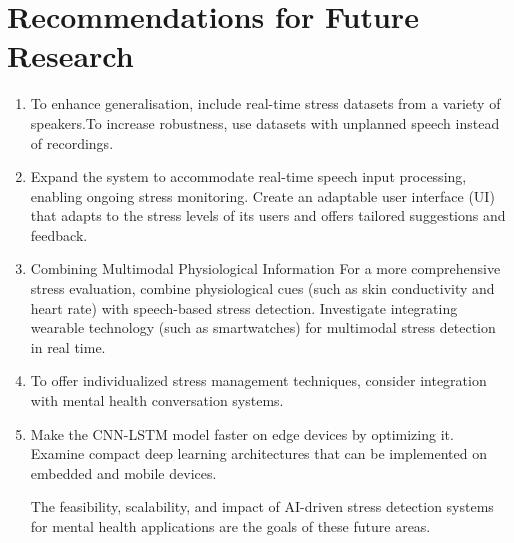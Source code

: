 \documentclass[Arial,12pt,openright,twoside]{book}
\begin{document}
  \section{Recommendations for Future Research}
   \begin{enumerate}
   \item To enhance generalisation, include real-time stress datasets from a variety of speakers.To increase robustness, use datasets with unplanned speech instead of recordings.
 \item  Expand the system to accommodate real-time speech input processing, enabling ongoing stress monitoring. Create an adaptable user interface (UI) that adapts to the stress levels of its users and offers tailored suggestions and feedback.
 \item Combining Multimodal Physiological Information For a more comprehensive stress evaluation, combine physiological cues (such as skin conductivity and heart rate) with speech-based stress detection. Investigate integrating wearable technology (such as smartwatches) for multimodal stress detection in real time.
 \item To offer individualized stress management techniques, consider integration with mental health conversation systems. 
 \item Make the CNN-LSTM model faster on edge devices by optimizing it. Examine compact deep learning architectures that can be implemented on embedded and mobile devices. 
 
The feasibility, scalability, and impact of AI-driven stress detection systems for mental health applications are the goals of these future areas. 
 \end{enumerate}
\end{document}
